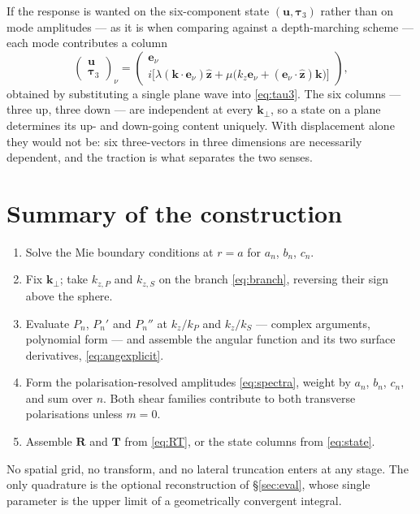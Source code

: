 \documentclass[11pt,a4paper]{article}
\newcommand{\bR}{\mathbf{R}}
\newcommand{\bT}{\mathbf{T}}
\newcommand{\bu}{\mathbf{u}}
\newcommand{\bk}{\mathbf{k}}
\newcommand{\bta}{\boldsymbol{\tau}}
\newcommand{\bep}{\mathbf{e}}
\newcommand{\zhat}{\hat{\mathbf{z}}}
\newcommand{\kperp}{\bk_\perp}
\begin{document}
If the response is wanted on the six-component state $(\bu,\bta_3)$ rather than
on mode amplitudes --- as it is when comparing against a depth-marching
scheme --- each mode contributes a column
\begin{equation}\label{eq:state}
  \begin{pmatrix}\bu\\[2pt]\bta_3\end{pmatrix}_\nu
  = \begin{pmatrix}
      \bep_\nu\\[4pt]
      i\big[\lambda(\bk\cdot\bep_\nu)\zhat + \mu\big(k_z\bep_\nu + (\bep_\nu\!\cdot\!\zhat)\bk\big)\big]
    \end{pmatrix},
\end{equation}
obtained by substituting a single plane wave into \eqref{eq:tau3}.  The six
columns --- three up, three down --- are independent at every $\kperp$, so a
state on a plane determines its up- and down-going content uniquely.  With
displacement alone they would not be: six three-vectors in three dimensions are
necessarily dependent, and the traction is what separates the two senses.

\section{Summary of the construction}

\begin{enumerate}
\item Solve the Mie boundary conditions at $r = a$ for $a_n$, $b_n$, $c_n$.
\item Fix $\kperp$; take $k_{z,P}$ and $k_{z,S}$ on the branch
      \eqref{eq:branch}, reversing their sign above the sphere.
\item Evaluate $P_n$, $P_n'$ and $P_n''$ at $k_z/k_P$ and $k_z/k_S$ ---
      complex arguments, polynomial form --- and assemble the angular function
      and its two surface derivatives, \eqref{eq:angexplicit}.
\item Form the polarisation-resolved amplitudes \eqref{eq:spectra}, weight by
      $a_n$, $b_n$, $c_n$, and sum over $n$.  Both shear families contribute to
      both transverse polarisations unless $m=0$.
\item Assemble $\bR$ and $\bT$ from \eqref{eq:RT}, or the state columns from
      \eqref{eq:state}.
\end{enumerate}

\noindent
No spatial grid, no transform, and no lateral truncation enters at any stage.
The only quadrature is the optional reconstruction of \S\ref{sec:eval}, whose
single parameter is the upper limit of a geometrically convergent integral.
\end{document}
